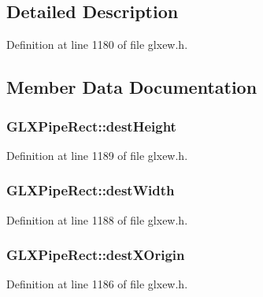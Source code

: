 \subsection{Detailed Description}


Definition at line 1180 of file glxew.\-h.



\subsection{Member Data Documentation}
\hypertarget{struct_g_l_x_pipe_rect_a858b0ea6642e451495aff35cfefbd083}{
\subsubsection[{dest\-Height}]{ G\-L\-X\-Pipe\-Rect\-::dest\-Height}}\label{struct_g_l_x_pipe_rect_a858b0ea6642e451495aff35cfefbd083}


Definition at line 1189 of file glxew.\-h.

\hypertarget{struct_g_l_x_pipe_rect_a3c07991d2a8fb6e973eae834650b3dad}{
\subsubsection[{dest\-Width}]{ G\-L\-X\-Pipe\-Rect\-::dest\-Width}}\label{struct_g_l_x_pipe_rect_a3c07991d2a8fb6e973eae834650b3dad}


Definition at line 1188 of file glxew.\-h.

\hypertarget{struct_g_l_x_pipe_rect_a8b7b941894ad3420326d7e9fa885bb71}{
\subsubsection[{dest\-X\-Origin}]{ G\-L\-X\-Pipe\-Rect\-::dest\-X\-Origin}}\label{struct_g_l_x_pipe_rect_a8b7b941894ad3420326d7e9fa885bb71}


Definition at line 1186 of file glxew.\-h.


